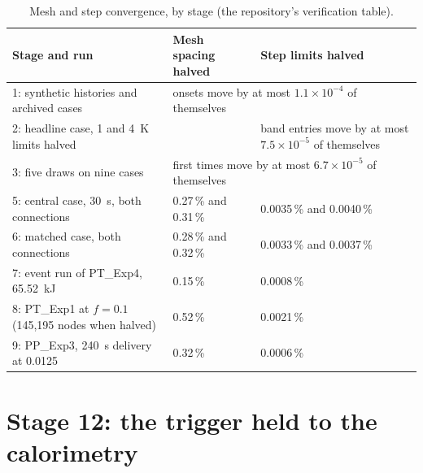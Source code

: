\documentclass[preprint,12pt]{elsarticle}
\begin{document}
\begin{table}[h]
\centering
\footnotesize
\caption{Mesh and step convergence, by stage (the repository's verification table).}
\label{tab:s-convergence}
\begin{tabular}{p{}p{}p{}}
\toprule
Stage and run & Mesh spacing halved & Step limits halved \\
\midrule
1: synthetic histories and archived cases & \multicolumn{2}{l}{onsets move by at most $1.1\times10^{-4}$ of themselves} \\
2: headline case, 1 and 4~K limits halved & & band entries move by at most $7.5\times10^{-5}$ of themselves \\
3: five draws on nine cases & \multicolumn{2}{l}{first times move by at most $6.7\times10^{-5}$ of themselves} \\
5: central case, 30~s, both connections & 0.27\,\% and 0.31\,\% & 0.0035\,\% and 0.0040\,\% \\
6: matched case, both connections & 0.28\,\% and 0.32\,\% & 0.0033\,\% and 0.0037\,\% \\
7: event run of PT\_Exp4, 65.52~kJ & 0.15\,\% & 0.0008\,\% \\
8: PT\_Exp1 at $f=0.1$ (145,195 nodes when halved) & 0.52\,\% & 0.0021\,\% \\
9: PP\_Exp3, 240~s delivery at 0.0125 & 0.32\,\% & 0.0006\,\% \\
\bottomrule
\end{tabular}
\end{table}

\section{Stage 12: the trigger held to the calorimetry}
\label{sec:s-stage12}
\end{document}
